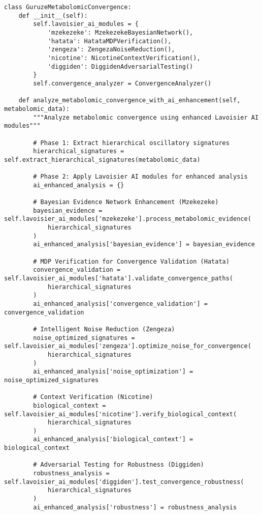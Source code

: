 \documentclass[12pt,a4paper]{article}
\begin{document}
\begin{lstlisting}[style=pythonstyle, caption=Guruza Convergence Integration with Lavoisier AI]
class GuruzeMetabolomicConvergence:
    def __init__(self):
        self.lavoisier_ai_modules = {
            'mzekezeke': MzekezekeBayesianNetwork(),
            'hatata': HatataMDPVerification(),
            'zengeza': ZengezaNoiseReduction(),
            'nicotine': NicotineContextVerification(),
            'diggiden': DiggidenAdversarialTesting()
        }
        self.convergence_analyzer = ConvergenceAnalyzer()
    
    def analyze_metabolomic_convergence_with_ai_enhancement(self, metabolomic_data):
        """Analyze metabolomic convergence using enhanced Lavoisier AI modules"""
        
        # Phase 1: Extract hierarchical oscillatory signatures
        hierarchical_signatures = self.extract_hierarchical_signatures(metabolomic_data)
        
        # Phase 2: Apply Lavoisier AI modules for enhanced analysis
        ai_enhanced_analysis = {}
        
        # Bayesian Evidence Network Enhancement (Mzekezeke)
        bayesian_evidence = self.lavoisier_ai_modules['mzekezeke'].process_metabolomic_evidence(
            hierarchical_signatures
        )
        ai_enhanced_analysis['bayesian_evidence'] = bayesian_evidence
        
        # MDP Verification for Convergence Validation (Hatata)
        convergence_validation = self.lavoisier_ai_modules['hatata'].validate_convergence_paths(
            hierarchical_signatures
        )
        ai_enhanced_analysis['convergence_validation'] = convergence_validation
        
        # Intelligent Noise Reduction (Zengeza)
        noise_optimized_signatures = self.lavoisier_ai_modules['zengeza'].optimize_noise_for_convergence(
            hierarchical_signatures
        )
        ai_enhanced_analysis['noise_optimization'] = noise_optimized_signatures
        
        # Context Verification (Nicotine)
        biological_context = self.lavoisier_ai_modules['nicotine'].verify_biological_context(
            hierarchical_signatures
        )
        ai_enhanced_analysis['biological_context'] = biological_context
        
        # Adversarial Testing for Robustness (Diggiden)
        robustness_analysis = self.lavoisier_ai_modules['diggiden'].test_convergence_robustness(
            hierarchical_signatures
        )
        ai_enhanced_analysis['robustness'] = robustness_analysis
        

\end{lstlisting}
\end{document}
